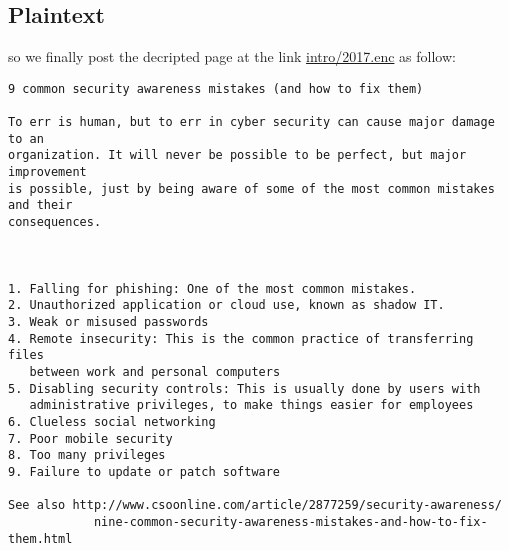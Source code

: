 \documentclass[a4paper,11pt]{article}
\begin{document}
\subsection{Plaintext}

so we finally post the decripted page at the link \href{https://security.rug.nl/infosec/intro/2017.enc}{intro/2017.enc} as follow:
\begin{lstlisting}
9 common security awareness mistakes (and how to fix them)

To err is human, but to err in cyber security can cause major damage to an
organization. It will never be possible to be perfect, but major improvement
is possible, just by being aware of some of the most common mistakes and their
consequences.



1. Falling for phishing: One of the most common mistakes.
2. Unauthorized application or cloud use, known as shadow IT.
3. Weak or misused passwords
4. Remote insecurity: This is the common practice of transferring files
   between work and personal computers
5. Disabling security controls: This is usually done by users with
   administrative privileges, to make things easier for employees
6. Clueless social networking
7. Poor mobile security
8. Too many privileges
9. Failure to update or patch software

See also http://www.csoonline.com/article/2877259/security-awareness/
            nine-common-security-awareness-mistakes-and-how-to-fix-them.html

\end{lstlisting}
\end{document}
